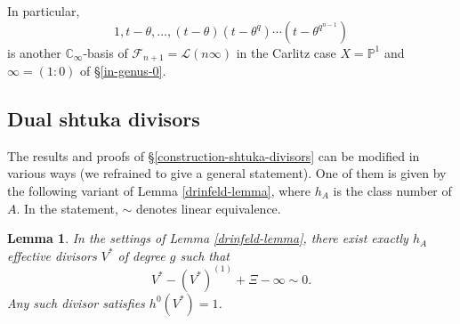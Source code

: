 \documentclass[11pt]{amsart}
\numberwithin{equation}{section}
\newcommand{\CC}{\mathbb{C}}
\newcommand{\PP}{\mathbb{P}}
\newtheorem{Lemma}[Theorem]{Lemma}
\begin{document}
In particular, $$1,t-\theta,\ldots,(t-\theta)(t-\theta^q)\cdots(t-\theta^{q^{n-1}})$$
is another $\CC_\infty$-basis of $\mathcal{F}_{n+1}=\mathcal{L}(n\infty)$ in the Carlitz case $X=\PP^1$ and $\infty=(1:0)$ of \S \ref{in-genus-0}.
 
\subsection{Dual shtuka divisors}

The results and proofs of \S \ref{construction-shtuka-divisors} can be modified in various ways (we refrained to give a general statement). One of them is given by the following variant of Lemma \ref{drinfeld-lemma}, where $h_A$ is the class number of $A$. In the statement, $\sim$ denotes linear equivalence.

\begin{Lemma}\label{lemma-dual-shtuka}
In the settings of Lemma \ref{drinfeld-lemma}, there exist exactly $h_A$ effective divisors $V^*$ of degree $g$ such that
$$V^*-(V^*)^{(1)}+\Xi-\infty\sim0.$$ Any such divisor satisfies $h^0(V^*)=1$.
\end{Lemma}
\end{document}
